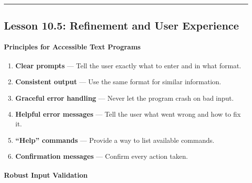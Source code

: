 \documentclass[
  justified,
  openright,
]{tufte-book}
\let\subsubsection\paragraph
\let\paragraph\paragraph
\let\subsubsection\paragraph
\let\paragraph\paragraph
\providecommand{\tightlist}{%
  \setlength{\itemsep}{0pt}\setlength{\parskip}{0pt}}
\begin{document}
\begin{center}\rule{0.5\linewidth}{0.5pt}\end{center}

\subsection{Lesson 10.5: Refinement and User
Experience}\label{lesson-10.5-refinement-and-user-experience}

\subsubsection{Principles for Accessible Text
Programs}\label{principles-for-accessible-text-programs}

\begin{enumerate}
\def\labelenumi{\arabic{enumi}.}
\tightlist
\item
  \textbf{Clear prompts} --- Tell the user exactly what to enter and in
  what format.
\item
  \textbf{Consistent output} --- Use the same format for similar
  information.
\item
  \textbf{Graceful error handling} --- Never let the program crash on
  bad input.
\item
  \textbf{Helpful error messages} --- Tell the user what went wrong and
  how to fix it.
\item
  \textbf{``Help'' commands} --- Provide a way to list available
  commands.
\item
  \textbf{Confirmation messages} --- Confirm every action taken.
\end{enumerate}

\subsubsection{Robust Input Validation}\label{robust-input-validation}
\end{document}
